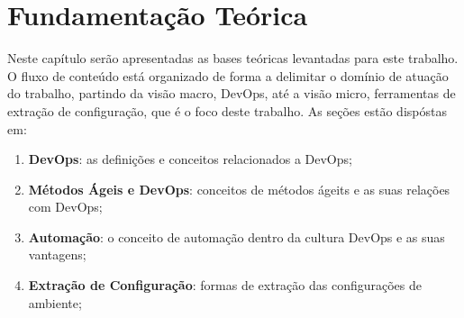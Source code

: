 \newpage\null\thispagestyle{empty}\newpage
\chapter{Fundamentação Teórica}
\label{chap:teoria}

Neste capítulo serão apresentadas as bases teóricas levantadas para este trabalho.
O fluxo de conteúdo está organizado de forma a delimitar o domínio de atuação
do trabalho, partindo da visão macro, DevOps, até a visão micro, ferramentas de
extração de configuração, que é o foco deste trabalho. As seções estão dispóstas em:

\begin{enumerate}
  \item \textbf{DevOps}: as definições e conceitos relacionados a DevOps;
  \item \textbf{Métodos Ágeis e DevOps}: conceitos de métodos ágeits e as suas relações com DevOps;
  \item \textbf{Automação}: o conceito de automação dentro da cultura DevOps e as suas vantagens;
  \item \textbf{Extração de Configuração}: formas de extração das configurações de ambiente;
\end{enumerate}




